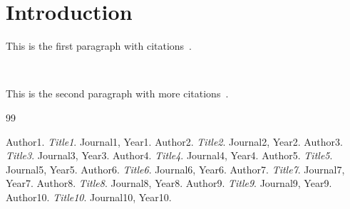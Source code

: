 \documentclass{article}
\begin{document}
\section{Introduction}

\lipsum[1]

This is the first paragraph with citations~\cite{citation1, citation2, citation3, citation4}.

\lipsum[2]~\cite{citation5}

This is the second paragraph with more citations~\cite{citation6, citation7, citation8, citation9, citation10}.

\begin{thebibliography}{99}

 Author1. \textit{Title1}. Journal1, Year1.
 Author2. \textit{Title2}. Journal2, Year2.
 Author3. \textit{Title3}. Journal3, Year3.
 Author4. \textit{Title4}. Journal4, Year4.
 Author5. \textit{Title5}. Journal5, Year5.
 Author6. \textit{Title6}. Journal6, Year6.
 Author7. \textit{Title7}. Journal7, Year7.
 Author8. \textit{Title8}. Journal8, Year8.
 Author9. \textit{Title9}. Journal9, Year9.
 Author10. \textit{Title10}. Journal10, Year10.

\end{thebibliography}
\end{document}

